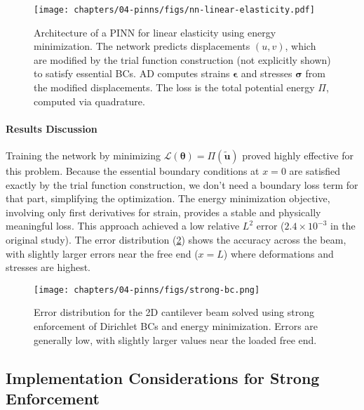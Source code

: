 \begin{figure}[htbp]
    \centering
    \texttt{[image: chapters/04-pinns/figs/nn-linear-elasticity.pdf]}
    \caption{Architecture of a PINN for linear elasticity using energy minimization. The network predicts displacements $(u,v)$, which are modified by the trial function construction (not explicitly shown) to satisfy essential BCs. AD computes strains $\boldsymbol{\epsilon}$ and stresses $\boldsymbol{\sigma}$ from the modified displacements. The loss is the total potential energy $\Pi$, computed via quadrature.}
    \label{fig:nn-2d-linear-elastic}
\end{figure}

\paragraph{Results Discussion}
Training the network by minimizing $\mathcal{L}(\boldsymbol{\theta}) = \Pi(\tilde{\mathbf{u}})$ proved highly effective for this problem. Because the essential boundary conditions at $x=0$ are satisfied exactly by the trial function construction, we don't need a boundary loss term for that part, simplifying the optimization. The energy minimization objective, involving only first derivatives for strain, provides a stable and physically meaningful loss. This approach achieved a low relative $L^2$ error ($2.4\times 10^{-3}$ in the original study). The error distribution (\cref{fig:strong-enforcement}) shows the accuracy across the beam, with slightly larger errors near the free end ($x=L$) where deformations and stresses are highest.

\begin{figure}[htbp]
    \centering
    \texttt{[image: chapters/04-pinns/figs/strong-bc.png]}
    \caption{Error distribution for the 2D cantilever beam solved using strong enforcement of Dirichlet BCs and energy minimization. Errors are generally low, with slightly larger values near the loaded free end.}
    \label{fig:strong-enforcement}
\end{figure}

\subsection{Implementation Considerations for Strong Enforcement}
\label{subsec:strong_implementation}


